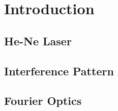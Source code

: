 \chapter{Introduction}

\section{He-Ne Laser}

\section{Interference Pattern}

\section{Fourier Optics}
